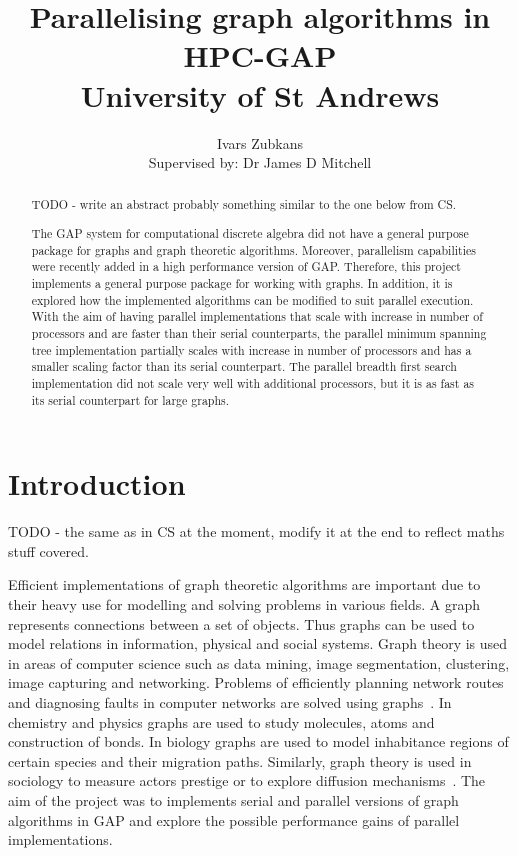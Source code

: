 \documentclass{report}
\title{Parallelising graph algorithms in HPC-GAP \\ \vspace{2 mm} {\large University of St Andrews}}
\author{Ivars Zubkans \\ \small Supervised by: Dr James D Mitchell}
\theoremstyle{plain}
\theoremstyle{definition}
\theoremstyle{remark}
\numberwithin{definition}{chapter}
\numberwithin{example}{chapter}
\numberwithin{figure}{chapter}
\begin{document}
\maketitle

\begin{abstract}

TODO - write an abstract probably something similar to the one below from CS.

The GAP system for computational discrete algebra did not have a general purpose package for graphs and graph theoretic algorithms. Moreover, parallelism capabilities were recently added in a high performance version of GAP. Therefore, this project implements a general purpose package for working with graphs. In addition, it is explored how the implemented algorithms can be modified to suit parallel execution. With the aim of having parallel implementations that scale with increase in number of processors and are faster than their serial counterparts, the parallel minimum spanning tree implementation partially scales with increase in number of processors and has a smaller scaling factor than its serial counterpart. The parallel breadth first search implementation did not scale very well with additional processors, but it is as fast as its serial counterpart for large graphs.
\end{abstract}

\tableofcontents

\chapter{Introduction}

TODO - the same as in CS at the moment, modify it at the end to reflect maths stuff covered.

Efficient implementations of graph theoretic algorithms are important due to their heavy use for modelling and solving problems in various fields. A graph represents connections between a set of objects. Thus graphs can be used to model relations in information, physical and social systems. Graph theory is used in areas of computer science such as data mining, image segmentation, clustering, image capturing and networking. Problems of efficiently planning network routes and diagnosing faults in computer networks are solved using graphs~\cite{6005872}. In chemistry and physics graphs are used to study molecules, atoms and construction of bonds. In biology graphs are used to model inhabitance regions of certain species and their migration paths. Similarly, graph theory is used in sociology to measure actors prestige or to explore diffusion mechanisms~\cite{shirinivas2010applications}. The aim of the project was to implements serial and parallel versions of graph algorithms in GAP and explore the possible performance gains of parallel implementations.
\end{document}
